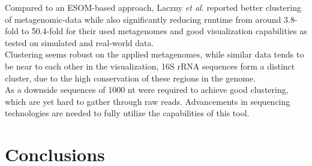 \documentclass[twocolumn]{bmcart}%
\begin{document}
Compared to an ESOM-based approach, Laczny \textit{et al.} reported better clustering of metagenomic-data while also significantly reducing runtime from around 3.8-fold to 50.4-fold\cite{Laczny2014} for their used metagenomes and good visualization capabilities as tested on simulated and real-world data.\\
Clustering seems robust on the applied metagenomes, while similar data tends to be near to each other in the visualization, 16S rRNA sequences form a distinct cluster, due to the high conservation of these regions in the genome.\\
As a downside sequences of 1000 nt were required to achieve good clustering, which are yet hard to gather through raw reads. Advancements in sequencing technologies are needed to fully utilize the capabilities of this tool.
\section*{Conclusions}


\end{document}
